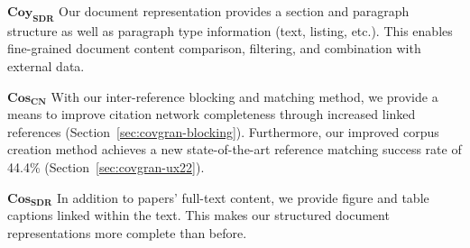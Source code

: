 $\mathbf{Coy_{SDR}}$ Our document representation provides a section and paragraph structure as well as paragraph type information (text, listing, etc.). This enables fine-grained document content comparison, filtering, and combination with external data. %

$\mathbf{Cos_{CN}}$ With our inter-reference blocking and matching method, we provide a means to improve citation network completeness through increased linked references (Section~\ref{sec:covgran-blocking}). Furthermore, our improved corpus creation method achieves a new state-of-the-art reference matching success rate of 44.4\% (Section~\ref{sec:covgran-ux22}).

$\mathbf{Cos_{SDR}}$ In addition to papers' full-text content, we provide figure and table captions linked within the text. This makes our structured document representations more complete than before.
